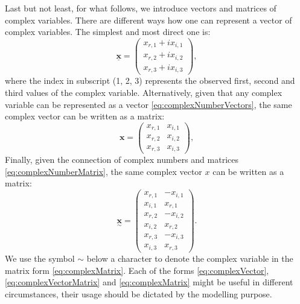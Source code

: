\documentclass[
]{book}
\begin{document}
Last but not least, for what follows, we introduce vectors and matrices of complex variables. There are different ways how one can represent a vector of complex variables. The simplest and most direct one is:
\begin{equation}
    \underline{\mathbf{x}} = \begin{pmatrix} x_{r,1} + i x_{i,1} \\ x_{r,2} + i x_{i,2} \\ x_{r,3} + i x_{i,3} \end{pmatrix} ,
    \label{eq:complexVector}
\end{equation}
where the index in subscript (1, 2, 3) represents the observed first, second and third values of the complex variable. Alternatively, given that any complex variable can be represented as a vector \eqref{eq:complexNumberVectors}, the same complex vector can be written as a matrix:
\begin{equation}
    \mathbf{x} = \begin{pmatrix} x_{r,1} & x_{i,1} \\ x_{r,2} & x_{i,2} \\ x_{r,3} & x_{i,3} \end{pmatrix} ,
    \label{eq:complexVectorMatrix}
\end{equation}
Finally, given the connection of complex numbers and matrices \eqref{eq:complexNumberMatrix}, the same complex vector \(x\) can be written as a matrix:
\begin{equation}
    \underset{\sim}{\mathbf{x}} = \begin{pmatrix} x_{r,1} & - x_{i,1} \\ x_{i,1} & x_{r,1} \\
                                 x_{r,2} & - x_{i,2} \\ x_{i,2} & x_{r,2} \\
                                 x_{r,3} & - x_{i,3} \\ x_{i,3} & x_{r,3} \end{pmatrix} .
    \label{eq:complexMatrix}
\end{equation}
We use the symbol \(\sim\) below a character to denote the complex variable in the matrix form \eqref{eq:complexMatrix}. Each of the forms \eqref{eq:complexVector}, \eqref{eq:complexVectorMatrix} and \eqref{eq:complexMatrix} might be useful in different circumstances, their usage should be dictated by the modelling purpose.
\end{document}
